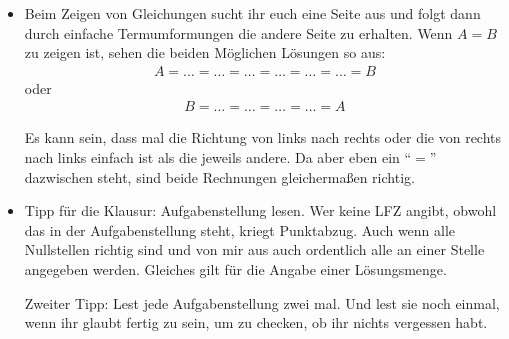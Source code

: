 \documentclass[11pt, a4paper]{article}
\begin{document}
\begin{itemize}
Es muss also korrekterweise heißen:
\begin{itemize}
\item $f$ ist streng monoton fallend (nicht $f(x)$)
\item $f$ ist stetig (nicht $f(x)$)
\item Der Graph von $f$ sieht aus wie \dots (nicht der Graph von $f(x)$)
\item $f$ ist differenzierbar (nicht $f(x)$)
\item $f$ ist bijektiv (nicht $f(x)$)
\item Es werden die Hoch- und Tiefpunkte von $f$ bestimmt (nicht von $f(x)$
\item $p$ hat den Grad 4 (nicht $p(x)$)\footnote{Ja, das habe ich letztes Tutorium beim Anschreiben selber nicht so angeschrieben -- mit Absicht. Ich glaube, es ist am Anfang einfacher, sich vorzustellen, dass $p(x)$ den Grad 4 hat, als dass $p$ den Grad 4 hat. $p(x)$ oder $q(x)$ erinnert mehr an ein Polynom als es vielleicht $p$ oder $q$ tut.}
\item usw. Es gibt vielfach mehr solche Beispiele.
\end{itemize}

\item Beim Zeigen von Gleichungen sucht ihr euch eine Seite aus und folgt dann durch einfache Termumformungen die andere Seite zu erhalten. Wenn $A = B$ zu zeigen ist, sehen die beiden Möglichen Lösungen so aus:
\begin{align*}
A = \dots = \dots = \dots = \dots = \dots = \dots = B
\end{align*}
oder
\begin{align*}
B = \dots = \dots = \dots = \dots = A
\end{align*}

Es kann sein, dass mal die Richtung von links nach rechts oder die von rechts nach links einfach ist als die jeweils andere. Da aber eben ein \enquote{$=$} dazwischen steht, sind beide Rechnungen gleichermaßen richtig.

\item Tipp für die Klausur: Aufgabenstellung lesen. Wer keine LFZ angibt, obwohl das in der Aufgabenstellung steht, kriegt Punktabzug. Auch wenn alle Nullstellen richtig sind und von mir aus auch ordentlich alle an einer Stelle angegeben werden. Gleiches gilt für die Angabe einer Lösungsmenge.

Zweiter Tipp: Lest jede Aufgabenstellung zwei mal. Und lest sie noch einmal, wenn ihr glaubt fertig zu sein, um zu checken, ob ihr nichts vergessen habt.


\end{itemize}
\end{document}
